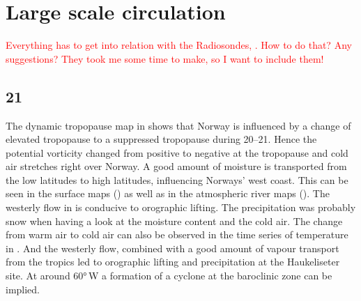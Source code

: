 \section{Large scale circulation} \label{sec:largeScale}
\textcolor{red}{Everything has to get into relation with the Radiosondes, . How to do that? Any suggestions? They took me some time to make, so I want to include them!}
\subsection*{\SI{21}{\dec}}
The dynamic tropopause map in  shows that Norway is influenced by a change of elevated tropopause to a suppressed tropopause during \SIrange{20}{21}{\dec}. Hence the potential vorticity changed from positive to negative at the tropopause and cold air stretches right over Norway.
A good amount of moisture is transported from the low latitudes to high latitudes, influencing Norways' west coast. This can be seen in the surface maps () as well as in the atmospheric river maps (). The westerly flow in  is conducive to orographic lifting. The precipitation was probably snow when having a look at the moisture content and the cold air. The change from warm air to cold air can also be observed in the time series of temperature in . And the westerly flow, combined with a good amount of vapour transport from the tropics led to orographic lifting and precipitation at the Haukeliseter site. 
At around \ang{60}{\,W} a formation of a cyclone at the baroclinic zone can be implied.  

